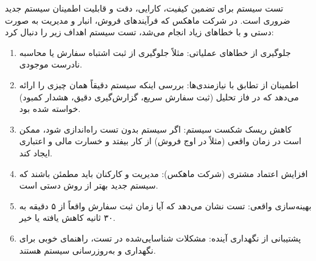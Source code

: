 \documentclass[12pt,a4paper]{report}
\begin{document}
تست سیستم برای تضمین کیفیت، کارایی، دقت و قابلیت اطمینان سیستم جدید ضروری است. در شرکت ماهکس که فرآیندهای فروش، انبار و مدیریت به صورت دستی و با خطاهای زیاد انجام می‌شد، تست سیستم اهداف زیر را دنبال کرد:
\begin{enumerate}
	\item 
جلوگیری از خطاهای عملیاتی: مثلاً جلوگیری از ثبت اشتباه سفارش یا محاسبه نادرست موجودی.
\item 
اطمینان از تطابق با نیازمندی‌ها: بررسی اینکه سیستم دقیقاً همان چیزی را ارائه می‌دهد که در فاز تحلیل (ثبت سفارش سریع، گزارش‌گیری دقیق، هشدار کمبود) خواسته شده بود.
\item 
کاهش ریسک شکست سیستم: اگر سیستم بدون تست راه‌اندازی شود، ممکن است در زمان واقعی (مثلاً در اوج فروش) از کار بیفتد و خسارت مالی و اعتباری ایجاد کند.
\item 
افزایش اعتماد مشتری (شرکت ماهکس): مدیریت و کارکنان باید مطمئن باشند که سیستم جدید بهتر از روش دستی است.
\item 
بهینه‌سازی واقعی: تست نشان می‌دهد که آیا زمان ثبت سفارش واقعاً از ۵ دقیقه به ۳۰ ثانیه کاهش یافته یا خیر.
\item 
پشتیبانی از نگهداری آینده: مشکلات شناسایی‌شده در تست، راهنمای خوبی برای نگهداری و به‌روزرسانی سیستم هستند.
\end{enumerate}
\end{document}
